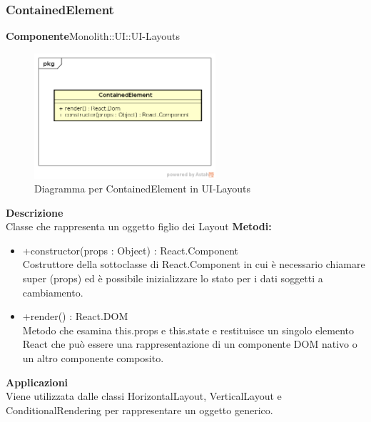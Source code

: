 \subsubsection{ContainedElement}
\textbf{Componente}Monolith::UI::UI-Layouts\\
   \FloatBarrier
   \begin{figure}[ht]
   \centering
   \includegraphics[width=0.6\textwidth]{img/single-ContainedElement}
   \caption{{Diagramma per ContainedElement in UI-Layouts}}
\end{figure}
\FloatBarrier
\textbf{Descrizione}\\
Classe che rappresenta un oggetto figlio dei Layout
\textbf{Metodi:} \begin{itemize}\item +constructor(props : Object) : React.Component \\Costruttore della sottoclasse di React.Component in cui è necessario chiamare super (props) ed è possibile inizializzare lo stato per i dati soggetti a cambiamento. \item +render() : React.DOM \\Metodo che esamina this.props e this.state e restituisce un singolo elemento React che può essere una rappresentazione di un componente DOM nativo o un altro componente composito.\end{itemize} 


\textbf{Applicazioni}\\
Viene utilizzata dalle classi HorizontalLayout, VerticalLayout e ConditionalRendering per rappresentare un oggetto generico. 


\clearpage

